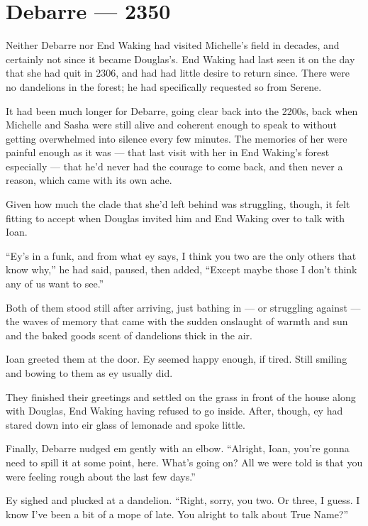 \hypertarget{debarre-2350}{%
\chapter{Debarre — 2350}\label{debarre-2350}}

Neither Debarre nor End Waking had visited Michelle's field in decades, and certainly not since it became Douglas's. End Waking had last seen it on the day that she had quit in 2306, and had had little desire to return since. There were no dandelions in the forest; he had specifically requested so from Serene.

It had been much longer for Debarre, going clear back into the 2200s, back when Michelle and Sasha were still alive and coherent enough to speak to without getting overwhelmed into silence every few minutes. The memories of her were painful enough as it was — that last visit with her in End Waking's forest especially — that he'd never had the courage to come back, and then never a reason, which came with its own ache.

Given how much the clade that she'd left behind was struggling, though, it felt fitting to accept when Douglas invited him and End Waking over to talk with Ioan.

``Ey's in a funk, and from what ey says, I think you two are the only others that know why,'' he had said, paused, then added, ``Except maybe those I don't think any of us want to see.''

Both of them stood still after arriving, just bathing in — or struggling against — the waves of memory that came with the sudden onslaught of warmth and sun and the baked goods scent of dandelions thick in the air.

Ioan greeted them at the door. Ey seemed happy enough, if tired. Still smiling and bowing to them as ey usually did.

They finished their greetings and settled on the grass in front of the house along with Douglas, End Waking having refused to go inside. After, though, ey had stared down into eir glass of lemonade and spoke little.

Finally, Debarre nudged em gently with an elbow. ``Alright, Ioan, you're gonna need to spill it at some point, here. What's going on? All we were told is that you were feeling rough about the last few days.''

Ey sighed and plucked at a dandelion. ``Right, sorry, you two. Or three, I guess. I know I've been a bit of a mope of late. You alright to talk about True Name?''

